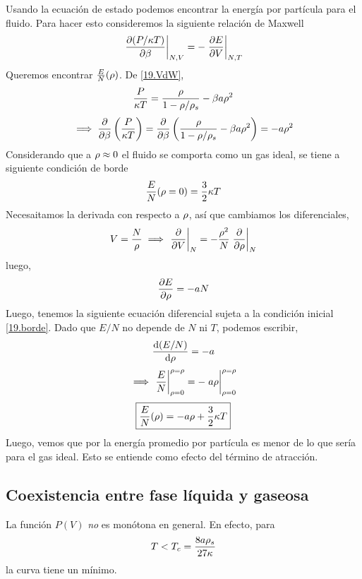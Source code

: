 Usando la ecuación de estado podemos encontrar la energía por partícula para el fluido. Para hacer esto consideremos la siguiente relación de Maxwell
\begin{equation}
\eval{  \pdv{(P/\k T)}{\b}}_{N,V}=-\eval{\pdv{E}{V}}_{N,T}
\end{equation}
Queremos encontrar $\frac{E}{N}(\rho )$. De \eqref{19.VdW},
\begin{equation}
  \frac{P}{\kappa T}=\frac{\rho }{1-\rho/\rho_s}-\beta a\rho^2
\end{equation}
\begin{equation}
  \implies \pdv{\beta}\left(\frac{P}{\kappa T}\right)=\pdv{\beta}\left(\frac{\rho }{1-\rho/\rho_s}-\beta a\rho^2\right)=-a\rho^2
\end{equation}
Considerando que a $\rho\approx 0$ el fluido se comporta como un gas ideal, se tiene a siguiente condición de borde
\begin{equation}\label{19.borde}
  \frac{E}{N}(\rho=0)=\frac{3}{2}\kappa T
\end{equation}
Necesaitamos la derivada con respecto a $\rho$, así que cambiamos los diferenciales,
\begin{equation}
  V=\frac{N}{\r }\implies \eval{\pdv{V}}_N=-\frac{\r^2}{N}\eval{\pdv{\r}}_N
\end{equation}
luego, 
\begin{equation}
  \pdv{E}{\rho}=-aN
\end{equation}
Luego, tenemos la siguiente ecuación diferencial sujeta a la condición inicial \eqref{19.borde}. Dado que $E/N$ no depende de $N$ ni $T$, podemos escribir,
\begin{equation}
  \dv{(E/N)}{\rho}=-a
\end{equation}
\begin{equation}
  \implies \eval{\frac{E}{N}}_{\r=0}^{\r=\r }=-\eval{a\r }_{\r=0}^{\r=\r }
\end{equation}
\begin{equation}
\boxed{  \frac{E}{N}(\rho )=-a\rho +\frac{3}{2}\kappa T}
\end{equation}
Luego, vemos que por la energía promedio por partícula es menor de lo que sería para el gas ideal. Esto se entiende como efecto del término de atracción.

\subsection{Coexistencia entre fase líquida y gaseosa}
La función $P(V)$ \textit{no} es monótona en general. En efecto, para
\begin{equation}
  T<T_c=\frac{8a\rho_s}{27\kappa }
\end{equation}
la curva tiene un mínimo.

